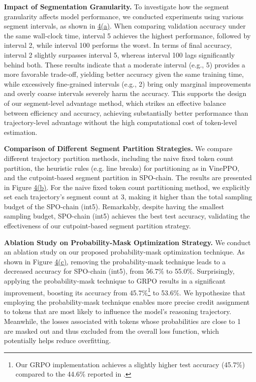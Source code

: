 \textbf{Impact of Segmentation Granularity.} 
To investigate how the segment granularity affects model performance, we conducted experiments using various segment intervals, as shown in \hyperref[fig:segment_interval]{4(a)}. When comparing validation accuracy under the same wall-clock time, interval 5 achieves the highest performance, followed by interval 2, while interval 100 performs the worst. In terms of final accuracy, interval 2 slightly surpasses interval 5, whereas interval 100 lags significantly behind both. These results indicate that a moderate interval (e.g., 5) provides a more favorable trade-off, yielding better accuracy given the same training time, while excessively fine-grained intervals (e.g., 2) bring only marginal improvements and overly coarse intervals severely harm the accuracy. This supports the design of our segment-level advantage method, which strikes an effective balance between efficiency and accuracy, achieving substantially better performance than trajectory-level advantage without the high computational cost of token-level estimation.

\textbf{Comparison of Different Segment Partition Strategies.} 
We compare different trajectory partition methods, including the naive fixed token count partition, the heuristic rules (e.g. line breaks) for partitioning as in VinePPO, and the cutpoint-based segment partition in SPO-chain. The results are presented in Figure \hyperref[fig:segment_interval]{4(b)}. For the naive fixed token count partitioning method, we explicitly set each trajectory's segment count at 3, making it higher than the total sampling budget of the SPO-chain (int5). Remarkably, despite having the smallest sampling budget, SPO-chain (int5) achieves the best test accuracy, validating the effectiveness of our cutpoint-based segment partition strategy.

\textbf{Ablation Study on Probability-Mask Optimization Strategy.} 
We conduct an ablation study on our proposed probability-mask optimization technique. As shown in Figure \hyperref[fig:segment_interval]{4(c)}, removing the probability-mask technique leads to a decreased accuracy for SPO-chain (int5), from 56.7\% to 55.0\%. Surprisingly, applying the probability-mask technique to GRPO results in a significant improvement, boosting its accuracy from 45.7\%\footnote{Our GRPO implementation achieves a slightly higher test accuracy (45.7\%) compared to the 44.6\% reported in \cite{kazemnejad2024vineppounlockingrlpotential}.} to 53.6\%. We hypothesize that employing the probability-mask technique enables more precise credit assignment to tokens that are most likely to influence the model’s reasoning trajectory. Meanwhile, the losses associated with tokens whose probabilities are close to 1 are masked out and thus excluded from the overall loss function, which potentially helps reduce overfitting.